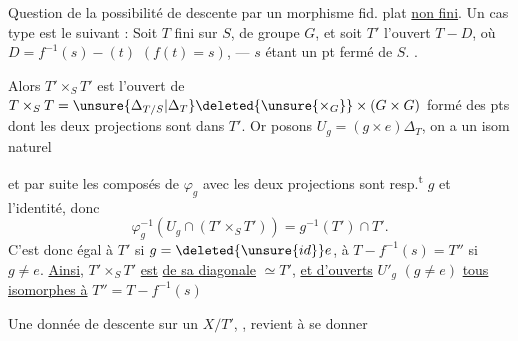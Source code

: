 Question de la possibilité de descente par un morphisme fid. plat \uline{non fini}. Un cas type est le suivant : Soit $T$   fini sur $S$, de groupe $G$, et  soit $T'$ l'ouvert  $T-D$, où $D=f^{-1}(s)-(t)$ $(f(t)=s)$, --- $s$ étant un pt fermé de $S$. .


Alors $T'\times_S T'$ est l'ouvert de $T\times_S T=\unsure{\Delta_{T/S}|\Delta_T}\deleted{\unsure{\times_G}}\times(G\times G)$ formé des pts dont les deux projections sont dans $T'$. Or posons $U_g=(g\times e)\Delta_T$,  on a un isom naturel
 

et par suite les composés de $\varphi_g$ avec les deux projections sont resp.\textsuperscript{t} $g$ et l'identité, donc
\[
\varphi_g^{-1}(U_g\cap(T'\times_S T'))=g^{-1}(T')\cap T'.
\]
C'est donc égal à $T'$ si $g=\deleted{\unsure{id}}e$, à $T-f^{-1}(s)=T''$ si $g\ne e$. \uline{Ainsi}, $T'\times_S T'$ \uline{est}    \uline{de sa diagonale} $\simeq T'$, \uline{et d'ouverts} $U'_g$ $(g\ne e)$ \uline{tous isomorphes à} $T''=T-f^{-1}(s)$

Une donnée de descente sur un $X/T'$, , revient  à se donner
\textsc{}\\
 
